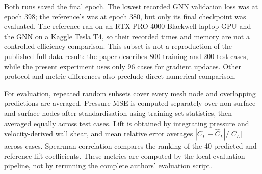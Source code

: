 \documentclass[journal]{IEEEtran}
\begin{document}
Both runs saved the final epoch. The lowest recorded GNN validation loss was at
epoch 398; the reference's was at epoch 380, but only its final checkpoint was
evaluated. The reference ran on an RTX PRO 4000 Blackwell laptop GPU and the GNN
on a Kaggle Tesla T4, so their recorded times and memory are not a controlled
efficiency comparison. This subset is not a reproduction of the published
full-data result: the paper describes 800 training and 200 test cases, while the
present experiment uses only 96 cases for gradient updates. Other protocol and
metric differences also preclude direct numerical comparison.

For evaluation, repeated random subsets cover every mesh node and overlapping
predictions are averaged. Pressure MSE is computed separately over non-surface
and surface nodes after standardisation using training-set statistics, then
averaged equally across test cases. Lift is obtained by integrating pressure and
velocity-derived wall shear, and mean relative error averages
$|C_L-\widehat C_L|/|C_L|$ across cases. Spearman correlation compares the
ranking of the 40 predicted and reference lift coefficients. These metrics are
computed by the local evaluation pipeline, not by rerunning the complete
authors' evaluation script.

\begin{table}[t]
\centering
\caption{Matched reduced AirfRANS results: mean per-case standardised pressure
MSE and lift scores. Lower is better except for Spearman correlation.}
\label{tab:airfrans_mse}
\end{table}
\end{document}
